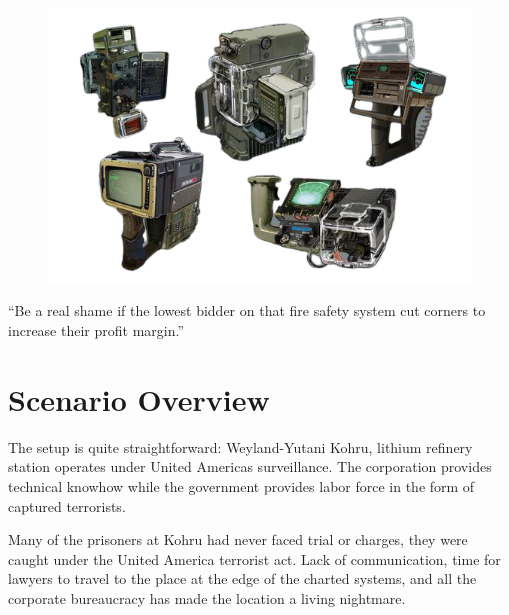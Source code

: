 \begin{figure}
    \centering
    \includegraphics[width=1.0\textwidth]{img/bg/motion-tracker.png}
\end{figure}






``Be a real shame if the lowest bidder on that fire safety system cut corners to increase their profit margin.''



\section{Scenario Overview}

The setup is quite straightforward: Weyland-Yutani Kohru, lithium refinery station operates under United Americas surveillance. 
The corporation provides technical knowhow while the government provides labor force in the form of captured terrorists. 

Many of the prisoners at Kohru had never faced trial or charges, they were caught under the United America terrorist act. Lack of communication, time for lawyers to travel to the place at the edge of the charted systems, and all the corporate bureaucracy has made the location a living nightmare.  



